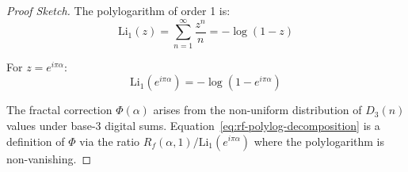 \begin{proof}[Proof Sketch]
The polylogarithm of order 1 is:
\begin{equation}
\text{Li}_1(z) = \sum_{n=1}^{\infty} \frac{z^n}{n} = -\log(1-z)
\end{equation}

For $z = e^{i\pi\alpha}$:
\begin{equation}
\text{Li}_1(e^{i\pi\alpha}) = -\log(1 - e^{i\pi\alpha})
\end{equation}

The fractal correction $\Phi(\alpha)$ arises from the non-uniform distribution of $D_3(n)$ values under base-3 digital sums. Equation~\eqref{eq:rf-polylog-decomposition} is a definition of $\Phi$ via the ratio $R_f(\alpha,1)/\text{Li}_1(e^{i\pi\alpha})$ where the polylogarithm is non-vanishing.
\end{proof}

